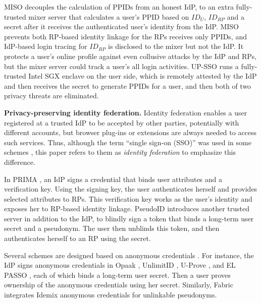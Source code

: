 MISO \cite{miso} decouples the calculation of PPIDs from an honest IdP,
 to an extra fully-trusted mixer server that calculates a user's PPID based on $ID_U$, $ID_{RP}$ and a secret after it receives the authenticated user's identity from the IdP.
MISO prevents both RP-based identity linkage for the RPs receives only PPIDs,
    and IdP-based login tracing for $ID_{RP}$ is disclosed to the mixer but not the IdP.
It protects a user's online profile against even collusive attacks by the IdP and RPs,
    but the mixer server could track a user's all login activities.
UP-SSO \cite{up-sso} runs a fully-trusted Intel SGX enclave on the user side,
 which is remotely attested by the IdP and then receives the secret to generate PPIDs for a user, and then both of two privacy threats are eliminated.

\noindent\textbf{Privacy-preserving identity federation.}
Identity federation enables a user registered at a trusted IdP to be accepted by other parties, potentially with different accounts,
but %
browser plug-ins or extensions are always needed to access such services.
Thus, although the term ``single sign-on (SSO)'' was used in some schemes \cite{PseudoID, Opaak, ELPASSO, WangWS13, HanCSTW18, HanCSTWW20}, this paper refers to them as \emph{identity federation} to emphasize this difference.

In PRIMA \cite{prima}, an IdP signs a credential
that binds user attributes and  a verification key.
Using the signing key, the user authenticates herself and provides selected attributes to RPs. This verification key works as the user's identity and exposes her to RP-based identity linkage.
PseudoID \cite{PseudoID} introduces another trusted server in addition to the IdP,
 to blindly sign \cite{blind-sign}
a token that binds a long-term user secret and a pseudonym.
The user then unblinds this token,
    and then authenticates herself to an RP using the secret.

Several schemes \cite{Opaak, hyperledge-idemix, uprov, UnlimitID, ELPASSO} are designed based on anonymous credentials \cite{anon-credential-2001, idemix, anon-credential}.
For instance, the IdP signs anonymous credentials in Opaak \cite{Opaak}, UnlimitID \cite{UnlimitID}, U-Prove \cite{uprov}, and EL PASSO \cite{ELPASSO}, each of which binds a long-term user secret. %
Then a user proves ownership of the anonymous credentials using her secret.
Similarly, Fabric \cite{hyperledge-idemix} integrates Idemix anonymous credentials \cite{idemix} for unlinkable pseudonyms. %


